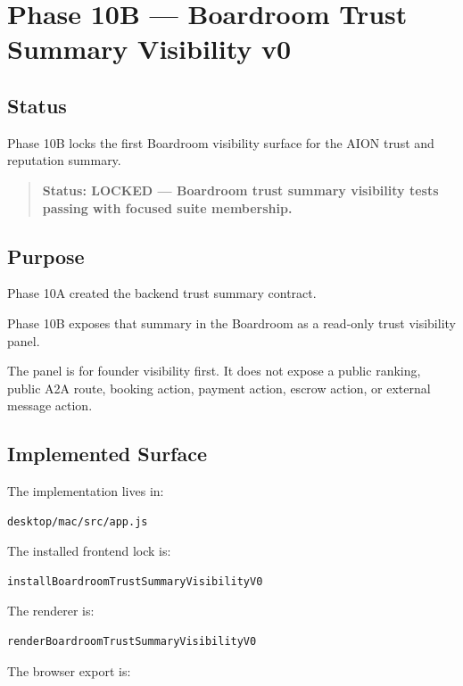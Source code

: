\section{Phase 10B --- Boardroom Trust Summary Visibility v0}
\label{sec:aion-boardroom-trust-summary-visibility-v0}

\subsection{Status}

Phase 10B locks the first Boardroom visibility surface for the AION trust and reputation summary.

\begin{quote}
\textbf{Status: LOCKED --- Boardroom trust summary visibility tests passing with focused suite membership.}
\end{quote}

\subsection{Purpose}

Phase 10A created the backend trust summary contract.

Phase 10B exposes that summary in the Boardroom as a read-only trust visibility panel.

The panel is for founder visibility first. It does not expose a public ranking, public A2A route, booking action, payment action, escrow action, or external message action.

\subsection{Implemented Surface}

The implementation lives in:

\begin{verbatim}
desktop/mac/src/app.js
\end{verbatim}

The installed frontend lock is:

\begin{verbatim}
installBoardroomTrustSummaryVisibilityV0
\end{verbatim}

The renderer is:

\begin{verbatim}
renderBoardroomTrustSummaryVisibilityV0
\end{verbatim}

The browser export is:

